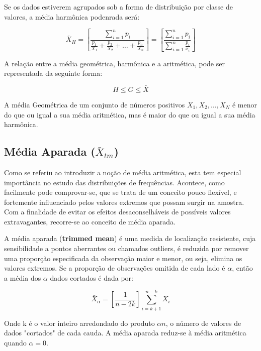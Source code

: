 Se os dados estiverem agrupados sob a forma de distribuição por classe de valores, a média harmônica podenrada será:


\begin{equation}\label{harmonicapondrada}
    \bar{X}_{H}= \left[  \frac{\sum_{i=1}^{n}p_{i}}{\frac{p_{1}}{X_{1}}+\frac{p_{2}}{X_{2}}+\ldots+\frac{p_{n}}{X_{n}}}\right ] = \left[  \frac{\sum_{i=1}^{n}p_{i}}{\sum_{i=1}^{n}\frac{p_{i}}{x_{i}}} \right ]
\end{equation}


A relação entre a média geométrica, harmônica e a aritmética, pode ser representada da seguinte forma:

$$ H \leq G \leq \bar{X}  $$

A média Geométrica de um conjunto de números positivos $X_{1},X_{2},\ldots,X_{N}$ é menor do que ou igual a sua média aritmética, mas é maior do que ou igual a sua média harmônica.


\subsection{Média Aparada ($\bar{X}_{tm}$)}

Como se referiu ao introduzir a noção de média aritmética, esta tem especial
importância no estudo das distribuições de frequências.
Acontece, como facilmente pode comprovar-se, que se trata de um conceito
pouco flexível, e fortemente influenciado pelos valores extremos que possam surgir na
amostra. Com a finalidade de evitar os efeitos desaconselháveis de possíveis valores
extravagantes, recorre-se ao conceito de média aparada. \vskip0.3cm


A média aparada (\textbf{trimmed mean}) é uma medida de localização resistente, cuja sensibilidade a pontos aberrantes ou chamados outliers, é reduzida por remover uma proporção especificada da observação maior e menor, ou seja, elimina os valores extremos. Se a proporção de observações omitida de cada lado é $\alpha$, então a média dos $\alpha$ dados cortados é dada por:

\begin{equation}\label{aparada}
    \bar{X}_{\alpha} = \left[\frac{1}{n-2k} \right] \sum_{i=k+1}^{n-k}X_{i}
\end{equation}


Onde k é o valor inteiro arredondado do produto $\alpha n$, o número de valores de dados "cortados" de cada cauda. A média aparada reduz-se à média aritmética quando $\alpha = 0$.\vskip0.3cm

